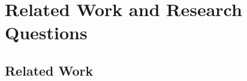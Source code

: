 \documentclass[msc,deptreport.inf]{infthesis} %
\newcommand{\matr}[1]{\mathbf{#1}}
\newcommand{\E}{\mathbb E}
\begin{document}
%
%
%


\chapter{Related Work and Research Questions}\label{ch:previous_work}

\section{Related Work}\label{sec:related_work}
\end{document}
